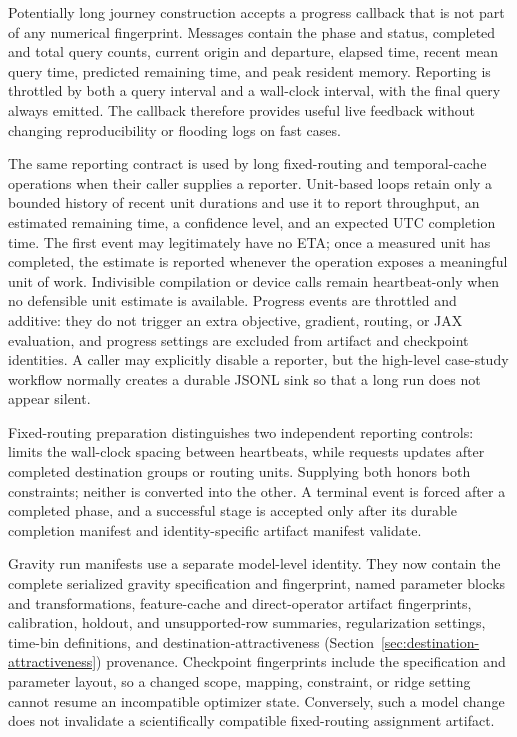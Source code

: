 Potentially long journey construction accepts a progress callback that is not
part of any numerical fingerprint. Messages contain the phase and status,
completed and total query counts, current origin and departure, elapsed time,
recent mean query time, predicted remaining time, and peak resident memory.
Reporting is throttled by both a query interval and a wall-clock interval, with
the final query always emitted. The callback therefore provides useful live
feedback without changing reproducibility or flooding logs on fast cases.

The same reporting contract is used by long fixed-routing and temporal-cache
operations when their caller supplies a reporter.  Unit-based loops retain
only a bounded history of recent unit durations and use it to report
throughput, an estimated remaining time, a confidence level, and an expected
UTC completion time.  The first event may legitimately have no ETA; once a
measured unit has completed, the estimate is reported whenever the operation
exposes a meaningful unit of work.  Indivisible compilation or device calls
remain heartbeat-only when no defensible unit estimate is available.  Progress
events are throttled and additive: they do not trigger an extra objective,
gradient, routing, or JAX evaluation, and progress settings are excluded from
artifact and checkpoint identities.  A caller may explicitly disable a
reporter, but the high-level case-study workflow normally creates a durable
JSONL sink so that a long run does not appear silent.

Fixed-routing preparation distinguishes two independent reporting controls:
 limits the wall-clock spacing between
heartbeats, while  requests updates after
completed destination groups or routing units.  Supplying both honors both
constraints; neither is converted into the other.  A terminal event is forced
after a completed phase, and a successful stage is accepted only after its
durable completion manifest and identity-specific artifact manifest validate.

Gravity run manifests use a separate model-level identity. They now contain
the complete serialized gravity specification and fingerprint, named parameter
blocks and transformations, feature-cache and direct-operator artifact
fingerprints, calibration, holdout, and unsupported-row summaries,
regularization settings, time-bin definitions, and destination-attractiveness
(Section~\ref{sec:destination-attractiveness}) provenance. Checkpoint
fingerprints include the specification and parameter
layout, so a changed scope, mapping, constraint, or ridge setting cannot resume
an incompatible optimizer state. Conversely, such a model change does not
invalidate a scientifically compatible fixed-routing assignment artifact.
